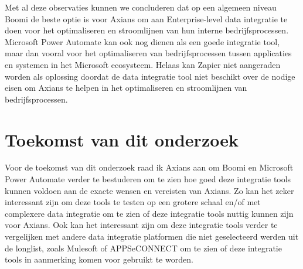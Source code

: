 \vspace{\baselineskip}

Met al deze observaties kunnen we concluderen dat op een algemeen niveau Boomi de beste optie is voor Axians om aan Enterprise-level data integratie te doen voor het optimaliseren en stroomlijnen van hun interne bedrijfsprocessen. Microsoft Power Automate kan ook nog dienen als een goede integratie tool, maar dan vooral voor het optimaliseren van bedrijfsprocessen tussen applicaties en systemen in het Microsoft ecosysteem. Helaas kan Zapier niet aangeraden worden als oplossing doordat de data integratie tool niet beschikt over de nodige eisen om Axians te helpen in het optimaliseren en stroomlijnen van bedrijfsprocessen.

\section{Toekomst van dit onderzoek}%
\label{Toekomst van dit onderzoek}

Voor de toekomst van dit onderzoek raad ik Axians aan om Boomi en Microsoft Power Automate verder te bestuderen om te zien hoe goed deze integratie tools kunnen voldoen aan de exacte wensen en vereisten van Axians. Zo kan het zeker interessant zijn om deze tools te testen op een grotere schaal en/of met complexere data integratie om te zien of deze integratie tools nuttig kunnen zijn voor Axians. Ook kan het interessant zijn om deze integratie tools verder te vergelijken met andere data integratie platformen die niet geselecteerd werden uit de longlist, zoals Mulesoft of APPSeCONNECT om te zien of deze integratie tools in aanmerking komen voor gebruikt te worden.

\newpage

